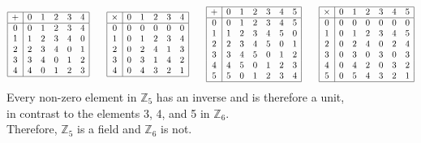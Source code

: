 \documentclass[11pt]{article}
\begin{document}
\[
  \begin{array}{|c|ccccc|}\hline
    + & 0 & 1 & 2 & 3 & 4\\\hline
    0 & 0 & 1 & 2 & 3 & 4\\
    1 & 1 & 2 & 3 & 4 & 0\\
    2 & 2 & 3 & 4 & 0 & 1\\
    3 & 3 & 4 & 0 & 1 & 2\\
    4 & 4 & 0 & 1 & 2 & 3\\\hline
  \end{array}
  \qquad
  \begin{array}{|c|ccccc|}\hline
    \times
      & 0 & 1 & 2 & 3 & 4\\\hline
    0 & 0 & 0 & 0 & 0 & 0\\
    1 & 0 & 1 & 2 & 3 & 4\\
    2 & 0 & 2 & 4 & 1 & 3\\
    3 & 0 & 3 & 1 & 4 & 2\\
    4 & 0 & 4 & 3 & 2 & 1\\\hline
  \end{array}
  \qquad
  \begin{array}{|c|cccccc|}\hline
    + & 0 & 1 & 2 & 3 & 4 & 5\\\hline
    0 & 0 & 1 & 2 & 3 & 4 & 5\\
    1 & 1 & 2 & 3 & 4 & 5 & 0\\
    2 & 2 & 3 & 4 & 5 & 0 & 1\\
    3 & 3 & 4 & 5 & 0 & 1 & 2\\
    4 & 4 & 5 & 0 & 1 & 2 & 3\\
    5 & 5 & 0 & 1 & 2 & 3 & 4\\\hline
  \end{array}
  \qquad
  \begin{array}{|c|cccccc|}\hline
    \times
      & 0 & 1 & 2 & 3 & 4 & 5\\\hline
    0 & 0 & 0 & 0 & 0 & 0 & 0\\
    1 & 0 & 1 & 2 & 3 & 4 & 5\\
    2 & 0 & 2 & 4 & 0 & 2 & 4\\
    3 & 0 & 3 & 0 & 3 & 0 & 3\\
    4 & 0 & 4 & 2 & 0 & 3 & 2\\
    5 & 0 & 5 & 4 & 3 & 2 & 1\\\hline
  \end{array}
\]
Every non-zero element in $\mathbb{Z}_5$ has an inverse and is therefore a unit,
\\in contrast to the elements 3, 4, and 5 in $\mathbb{Z}_6$.
\\Therefore,  $\mathbb{Z}_5$ is a field and  $\mathbb{Z}_6$ is not.
\end{document}
